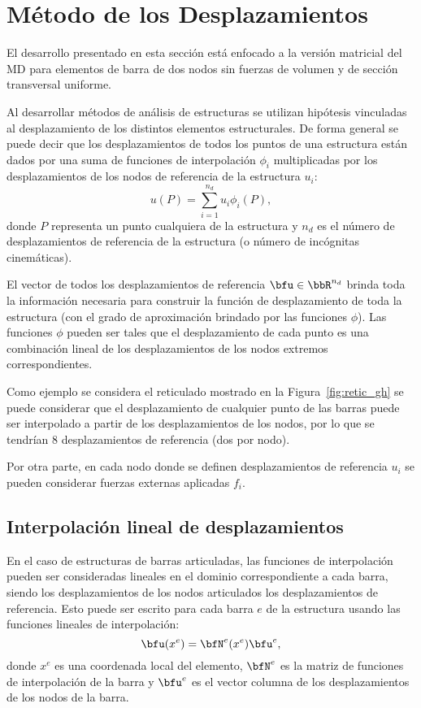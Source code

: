 \section{Método de los Desplazamientos}

El desarrollo presentado en esta sección está enfocado a la versión matricial del MD para elementos de barra de dos nodos sin fuerzas de volumen y de sección transversal uniforme. %
%

Al desarrollar métodos de análisis de estructuras se utilizan hipótesis vinculadas al desplazamiento de los distintos elementos estructurales. %
De forma general se puede decir que los desplazamientos de todos los puntos de una estructura están dados por una suma de funciones de interpolación $\phi_i$ multiplicadas por los desplazamientos de los nodos de referencia de la estructura $u_i$:
%
\begin{equation}
u(P) = \sum_{i=1}^{n_d} u_i \phi_i(P),
\end{equation}
%
donde $P$ representa un punto cualquiera de la estructura y $n_d$ es el número de desplazamientos de referencia de la estructura (o número de incógnitas cinemáticas). %


El vector de todos los desplazamientos de referencia $\bfu \in \bbR^{n_d}$ brinda toda la información necesaria para construir la función de desplazamiento de toda la estructura (con el grado de aproximación brindado por las funciones $\phi$). %
%
Las funciones $\phi$ pueden ser tales que el desplazamiento de cada punto es una combinación lineal de los desplazamientos de los nodos extremos correspondientes.

Como ejemplo se considera el reticulado mostrado en la Figura~\ref{fig:retic_gh} se puede considerar que el desplazamiento de cualquier punto de las barras puede ser interpolado a partir de los desplazamientos de los nodos, por lo que se tendrían $8$ desplazamientos de referencia (dos por nodo).

Por otra parte, en cada nodo donde se definen desplazamientos de referencia $u_i$ se pueden considerar fuerzas externas aplicadas $f_i$.

\subsection{Interpolación lineal de desplazamientos}

En el caso de estructuras de barras articuladas, las funciones de interpolación pueden ser consideradas lineales en el dominio correspondiente a cada barra, siendo los desplazamientos de los nodos articulados los desplazamientos de referencia. %
%
Esto puede ser escrito para cada barra $e$ de la estructura usando las funciones lineales de interpolación:
%
\begin{equation}
\bfu (x^e) = \bfN^e(x^e) \bfu^e,
\end{equation}
%
donde $x^e$ es una coordenada local del elemento, $\bfN^e$ es la matriz de funciones de interpolación de la barra y $\bfu^e$ es el vector columna de los desplazamientos de los nodos de la barra. %
%


